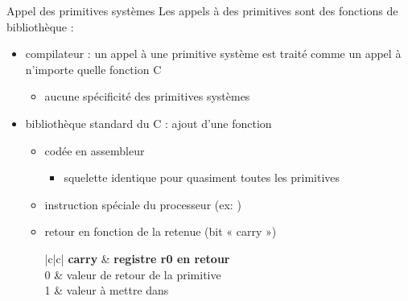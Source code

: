 \begin {frame} {Appel des primitives systèmes}
    Les appels à des primitives sont des fonctions de bibliothèque :
    \begin {itemize}
	\item compilateur : un appel à une primitive
	    système est traité comme un appel à n'importe quelle
	    fonction C

	    \begin {itemize}
		\item aucune spécificité des primitives systèmes
	    \end {itemize}

	\item bibliothèque standard du C : ajout d'une fonction

	    \begin {itemize}
		\item codée en assembleur
		    \begin {itemize}
			\item squelette identique pour quasiment
			    toutes les primitives
		    \end {itemize}
		\item instruction spéciale du processeur (ex: )
		\item retour en fonction de la retenue (bit « carry »)

		    \ctableau {\fD} {|c|c|} {
			\textbf {carry} & \textbf {registre r0 en retour}
			    \\
			0 & valeur de retour de la primitive \\
			1 & valeur à mettre dans  \\
		    }
	    \end {itemize}
    \end {itemize}
\end {frame}



